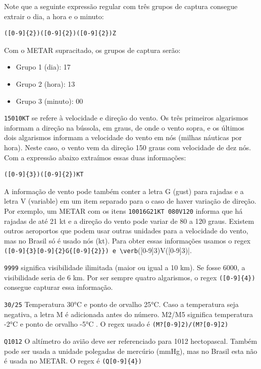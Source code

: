 Note que a seguinte expressão regular com três grupos de captura consegue extrair o dia, a hora e o minuto:

\begin{verbatim}
([0-9]{2})([0-9]{2})([0-9]{2})Z
\end{verbatim}

Com o METAR supracitado, os grupos de captura serão:

\begin{itemize}
\item Grupo 1 (dia): 17
\item Grupo 2 (hora): 13
\item Grupo 3 (minuto): 00
\end{itemize}

\texttt{15010KT} se refere à velocidade e direção do vento. Os três primeiros algarismos informam a direção na bússola, 
em graus, de onde o vento sopra, e os últimos dois algarismos informam a velocidade do vento em nós (milhas náuticas por hora). 
Neste caso, o vento vem da direção 150 graus com velocidade de dez nós. Com a expressão abaixo extraímos essas duas informações:

\begin{verbatim}
([0-9]{3})([0-9]{2})KT
\end{verbatim}

A informação de vento pode também conter a letra G (gust) para rajadas e a letra V (variable) em um item separado para o 
caso de haver variação de direção. Por exemplo, um METAR com os itens \texttt{10016G21KT 080V120} informa que 
há rajadas de até 21 kt e a direção do vento pode variar de 80 a 120 graus. Existem outros aeroportos que podem 
usar outras unidades para a velocidade do vento, mas no Brasil só é usado nós (kt). Para obter essas informações 
usamos o regex \verb|([0-9]{3}[0-9]{2}G{[0-9]{2}}) e \verb|([0-9]{3})V([0-9]{3})|.

\texttt{9999} significa visibilidade ilimitada (maior ou igual a 10 km). Se fosse 6000, a visibilidade seria de 
6 km. Por ser sempre quatro algarismos, o regex \verb|([0-9]{4})| consegue capturar essa informação.

\texttt{30/25} Temperatura 30°C e ponto de orvalho 25°C. Caso a temperatura seja negativa, a letra M é adicionada 
antes do número. M2/M5 significa temperatura -2°C e ponto de orvalho -5°C \cite{METAR-help}. O regex usado é
\texttt{(M?[0-9]{2})/(M?[0-9]{2})}

\texttt{Q1012} O altímetro do avião deve ser referenciado para 1012 hectopascal. Também pode ser usada a unidade 
polegadas de mercúrio (mmHg), mas no Brasil esta não é usada no METAR. O regex é \verb|(Q[0-9]{4})|

